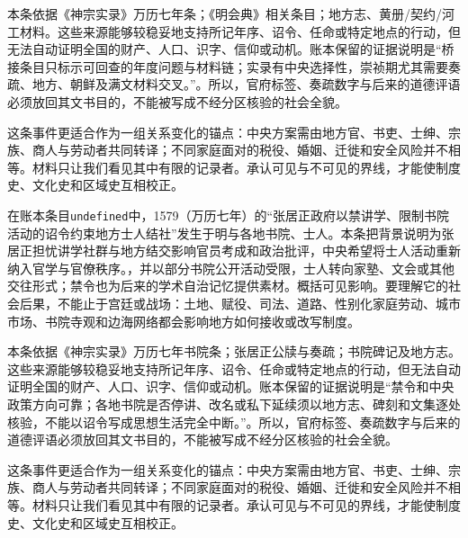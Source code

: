 本条依据《神宗实录》万历七年条；《明会典》相关条目；地方志、黄册/契约/河工材料。这些来源能够较稳妥地支持所记年序、诏令、任命或特定地点的行动，但无法自动证明全国的财产、人口、识字、信仰或动机。账本保留的证据说明是“桥接条目只标示可回查的年度问题与材料链；实录有中央选择性，崇祯期尤其需要奏疏、地方、朝鲜及满文材料交叉。”。所以，官府标签、奏疏数字与后来的道德评语必须放回其文书目的，不能被写成不经分区核验的社会全貌。

这条事件更适合作为一组关系变化的锚点：中央方案需由地方官、书吏、士绅、宗族、商人与劳动者共同转译；不同家庭面对的税役、婚姻、迁徙和安全风险并不相等。材料只让我们看见其中有限的记录者。承认可见与不可见的界线，才能使制度史、文化史和区域史互相校正。

在账本条目\texttt{undefined}中，1579（万历七年）的“张居正政府以禁讲学、限制书院活动的诏令约束地方士人结社”发生于明与各地书院、士人。本条把背景说明为张居正担忧讲学社群与地方结交影响官员考成和政治批评，中央希望将士人活动重新纳入官学与官僚秩序。，并以部分书院公开活动受限，士人转向家塾、文会或其他交往形式；禁令也为后来的学术自治记忆提供素材。概括可见影响。要理解它的社会后果，不能止于宫廷或战场：土地、赋役、司法、道路、性别化家庭劳动、城市市场、书院寺观和边海网络都会影响地方如何接收或改写制度。

本条依据《神宗实录》万历七年书院条；张居正公牍与奏疏；书院碑记及地方志。这些来源能够较稳妥地支持所记年序、诏令、任命或特定地点的行动，但无法自动证明全国的财产、人口、识字、信仰或动机。账本保留的证据说明是“禁令和中央政策方向可靠；各地书院是否停讲、改名或私下延续须以地方志、碑刻和文集逐处核验，不能以诏令写成思想生活完全中断。”。所以，官府标签、奏疏数字与后来的道德评语必须放回其文书目的，不能被写成不经分区核验的社会全貌。

这条事件更适合作为一组关系变化的锚点：中央方案需由地方官、书吏、士绅、宗族、商人与劳动者共同转译；不同家庭面对的税役、婚姻、迁徙和安全风险并不相等。材料只让我们看见其中有限的记录者。承认可见与不可见的界线，才能使制度史、文化史和区域史互相校正。

